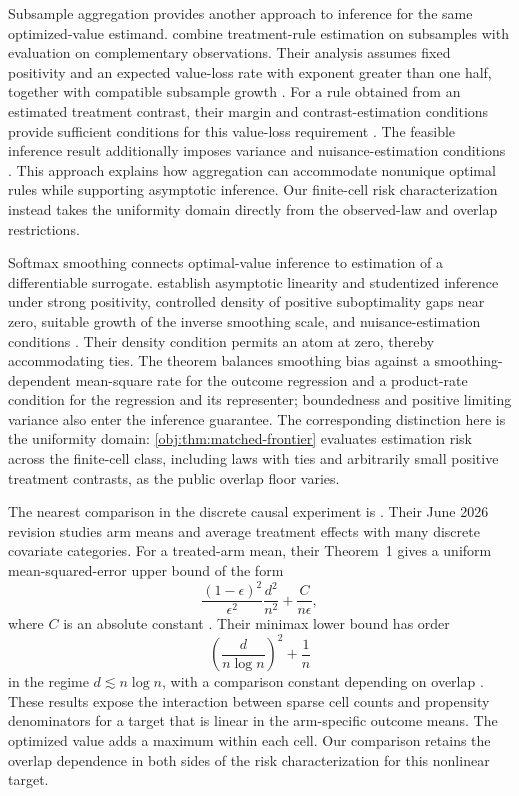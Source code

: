 Subsample aggregation provides another approach to inference for the same optimized-value estimand. \citet[Theorems~2--3]{Shi2020} combine treatment-rule estimation on subsamples with evaluation on complementary observations. Their analysis assumes fixed positivity and an expected value-loss rate with exponent greater than one half, together with compatible subsample growth \citep[conditions~(A3)--(A4)]{Shi2020}. For a rule obtained from an estimated treatment contrast, their margin and contrast-estimation conditions provide sufficient conditions for this value-loss requirement \citep[conditions~(A5)--(A6)]{Shi2020}. The feasible inference result additionally imposes variance and nuisance-estimation conditions \citep[Theorem~3 and equations~(9)--(11)]{Shi2020}. This approach explains how aggregation can accommodate nonunique optimal rules while supporting asymptotic inference. Our finite-cell risk characterization instead takes the uniformity domain directly from the observed-law and overlap restrictions.

Softmax smoothing connects optimal-value inference to estimation of a differentiable surrogate. \citet[Theorem~3.3 and Corollary~3.4]{WhitehouseChenAusternSyrgkanis2025} establish asymptotic linearity and studentized inference under strong positivity, controlled density of positive suboptimality gaps near zero, suitable growth of the inverse smoothing scale, and nuisance-estimation conditions \citep[Assumptions~1--2]{WhitehouseChenAusternSyrgkanis2025}. Their density condition permits an atom at zero, thereby accommodating ties. The theorem balances smoothing bias against a smoothing-dependent mean-square rate for the outcome regression and a product-rate condition for the regression and its representer; boundedness and positive limiting variance also enter the inference guarantee. The corresponding distinction here is the uniformity domain: \cref{obj:thm:matched-frontier} evaluates estimation risk across the finite-cell class, including laws with ties and arbitrarily small positive treatment contrasts, as the public overlap floor varies.

The nearest comparison in the discrete causal experiment is \citet{ZengBalakrishnanHanKennedy2024Discrete}. Their June 2026 revision studies arm means and average treatment effects with many discrete covariate categories. For a treated-arm mean, their Theorem~1 gives a uniform mean-squared-error upper bound of the form
\[
\frac{(1-\epsilon)^2}{\epsilon^2}\frac{d^2}{n^2}
+\frac{C}{n\epsilon},
\]
where \(C\) is an absolute constant \citep[Theorem~1]{ZengBalakrishnanHanKennedy2024Discrete}. Their minimax lower bound has order
\[
\left(\frac{d}{n\log n}\right)^2+\frac{1}{n}
\]
in the regime \(d\lesssim n\log n\), with a comparison constant depending on overlap \citep[Theorem~2]{ZengBalakrishnanHanKennedy2024Discrete}. These results expose the interaction between sparse cell counts and propensity denominators for a target that is linear in the arm-specific outcome means. The optimized value adds a maximum within each cell. Our comparison retains the overlap dependence in both sides of the risk characterization for this nonlinear target.

